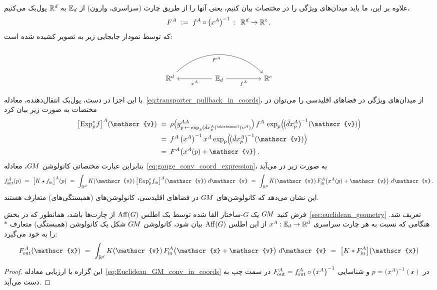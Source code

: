 علاوه بر این، ما باید میدان‌های ویژگی را در مختصات بیان کنیم، یعنی آنها را از طریق چارت (سراسری، وارون) از $\mathbb{E}_d$ به $\mathbb{R}^d$ پول‌بک می‌کنیم،
\begin{align}
	F^A\ :=\ f^A \circ \big(x^A \big)^{-1}\, :\,\ \mathbb{R}^d \to \mathbb{R}^c \,,
\end{align}
که توسط نمودار جابجایی زیر به تصویر کشیده شده است:

\begin{equation}\label{cd:feature_field_chart_pullback_Rd}
	\begin{tikzcd}[row sep=2.5em, column sep=5em]
		\R^d \arrow[rr, bend left=45, "{F^A}"', pos=0.4] &
		\Euc_d \arrow[l, "{x^A}"] \arrow[r, "{f^A}"'] &
		\R^c
	\end{tikzcd}
\end{equation}

با این اجزا در دست، پول‌بک انتقال‌دهنده، معادله~\eqref{eq:transporter_pullback_in_coords}، از میدان‌های ویژگی در فضاهای اقلیدسی را می‌توان در مختصات به صورت زیر بیان کرد
\begin{align}\label{eq:transporter_pullback_Euclidean}
	\big[\mkern-2mu \Expspf \big]^A (\mathscr{v})
	\ =&\,\ \rho\pig( g^{AA}_{p \,\leftarrow\, \exp_p (\hat{d}x_p^A)^{\shortminus1}(v^A)} \pig) \,
	f^A\, \exp_p \!\pig(\! \big(\hat{d}x_p^A\big)^{\mkern-2mu-1}(\mathscr{v}) \pig) \notag \\
	\ =&\,\ f^A\, \big(x^A\big)^{-1}\, x^A \exp_p \!\pig(\! \big(\hat{d}x_p^A\big)^{\mkern-2mu-1}(\mathscr{v}) \pig) \notag \\
	\ =&\,\ F^A \big( x^A(p) + \mathscr{v} \big) \,.
\end{align}
بنابراین عبارت مختصاتی کانولوشن $G\mkern-1.4muM$، معادله~\eqref{eq:gauge_conv_coord_expression}، به صورت زیر در می‌آید
\begin{align}\label{eq:Euclidean_GM_conv_in_coords}
	\fout^A(p)
	\ =\ \big[K \star \fin \big]^A (p)
	\ =\ \int_{\R^d} K(\mathscr{v})\, \big[\mkern-2mu \Expspfin\big]^A (\mathscr{v})\ d\mathscr{v}
	\ =\ \int_{\R^d} K(\mathscr{v})\, \Fin^A\big( x^A(p) + \mathscr{v} \big)\ d\mathscr{v} \,.
\end{align}
این نشان می‌دهد که کانولوشن‌های $G\mkern-1.4muM$ در فضاهای اقلیدسی، کانولوشن‌های (همبستگی‌های) متعارف هستند.
\begin{thm}
	\label{thm:Euclidean_GM_conv_is_conventional_conv}
	فرض کنید $G\mkern-1.4muM$ یک $G$-ساختار القا شده توسط یک اطلس $\operatorname{Aff}(G)$ از چارت‌ها باشد، همانطور که در بخش~\ref{sec:euclidean_geometry} تعریف شد.
	هنگامی که نسبت به هر چارت سراسری $x^A: \mathbb{E}_d \to \mathbb{R}^d$ از این اطلس $\operatorname{Aff}(G)$ بیان شود، کانولوشن $G\mkern-1.4muM$ شکل یک کانولوشن (همبستگی) متعارف $*$\, را به خود می‌گیرد:
	\begin{align}
		\Fout^A(\mathscr{x})
		\ =\ \int_{\R^d} K(\mathscr{v})\, \Fin^A\big( \mathscr{x} + \mathscr{v} \big)\ d\mathscr{v}
		\ =\ \big[ K * \Fin^A \big] (\mathscr{x})
	\end{align}
\end{thm}
\begin{proof}
	این گزاره با ارزیابی معادله~\eqref{eq:Euclidean_GM_conv_in_coords} در $p = \big(x^A\big)^{-1}(\mathscr{x})$ و شناسایی $F_\textup{\:\!\!out}^A = f_\textup{\:\!\!out}^A \circ \big(x^A\big)^{-1}$ در سمت چپ به دست می‌آید.
\end{proof}

